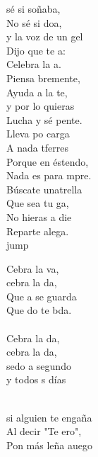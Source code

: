 \begin{cancion}%
	 sé si soñaba,\\
	No sé si doa, \\
	y la voz de un gel\\
	Dijo que te a:\\
	Celebra la a.   \\
	Piensa bremente,\\
	Ayuda a la te,\\
	y por lo  quieras\\
	Lucha y sé pente.\\
	Lleva po carga\\
	A nada tferres\\
	Porque en éstendo,\\
	Nada es para mpre.\\
	Búscate unatrella\\
	Que sea tu ga, \\
	No hieras a die\\
	Reparte alega.\\jump\\
	\begin{chorus}%
	Cebra la va, \\
	cebra la da,\\
	Que a se guarda\\
	Que do te bda.\\
	\jump\\
	Cebra la da, \\
	cebra la da,\\
	sedo a segundo\\
	y todos s días\\
	\end{chorus}%
	\jump\\
	si alguien te engaña\\
	Al decir "Te ero",\\
	Pon más leña auego\\

\end{cancion}
